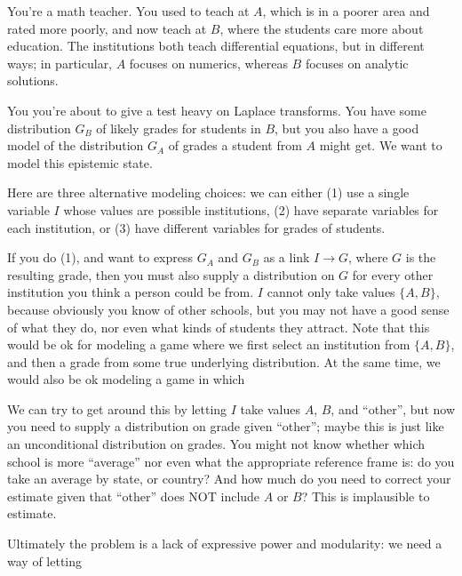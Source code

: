 \documentclass{article}
\begin{document}
		
	\begin{example}
		You're a math teacher. You used to teach at $A$, which is in a poorer area and rated more poorly, and now teach at $B$, where the students care more about education. The institutions both teach differential equations, but in different ways; in particular, $A$ focuses on numerics, whereas $B$ focuses on analytic solutions.
		
		You you're about to give a test heavy on Laplace transforms.
		You have some distribution $G_B$ of likely grades for students in $B$, but you also have a good model of the distribution $G_A$ of grades a student from $A$ might get. We want to model this epistemic state.

		
		Here are three alternative modeling choices: we can either (1) use a single variable $I$ whose values are possible institutions, (2) have separate variables for each institution, or (3) have different variables for grades of students.
		
		\begin{center}
		\end{center}
		
		If you do (1), and want to express $G_A$ and $G_B$ as a link $I \to G$, where $G$ is the resulting grade, then you must also supply a distribution on $G$ for every other institution you think a person could be from. $I$ cannot only take values $\{A,B\} $, because obviously you know of other schools, but you may not have a good sense of what they do, nor even what kinds of students they attract. 
			Note that this would be ok for modeling a game where we first select an institution from $\{A, B\}$, and then a grade from some true underlying distribution. At the same time, we would also be ok modeling a game in which
		
		We can try to get around this by letting $I$ take values $A$, $B$, and ``other'', but now you need to supply a distribution on grade given ``other''; maybe this is just like an unconditional distribution on grades. You might not know whether which school is more ``average'' nor even what the appropriate reference frame is: do you take an average by state, or country? And how much do you need to correct your estimate given that ``other'' does NOT include $A$ or $B$? This is implausible to estimate. 		
	
		Ultimately the problem is a lack of expressive power and modularity: we need a way of letting 
		
		
		
		

	\end{example}
\end{document}
